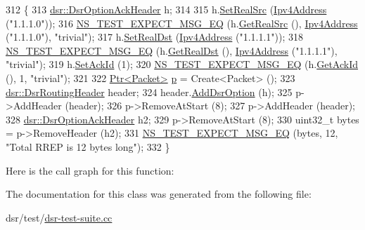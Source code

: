 \begin{DoxyCode}
312 \{
313   \hyperlink{classns3_1_1dsr_1_1DsrOptionAckHeader}{dsr::DsrOptionAckHeader} h;
314 
315   h.\hyperlink{classns3_1_1dsr_1_1DsrOptionAckHeader_a4c0aa9826576eb9ceb2ebdba5bcce673}{SetRealSrc} (\hyperlink{classns3_1_1Ipv4Address}{Ipv4Address} (\textcolor{stringliteral}{"1.1.1.0"}));
316   \hyperlink{group__testing_ga7304ba46a28d8cf08dfdfd6499cf7068}{NS\_TEST\_EXPECT\_MSG\_EQ} (h.\hyperlink{classns3_1_1dsr_1_1DsrOptionAckHeader_aea48708d400fd6c6424c5b35a170c189}{GetRealSrc} (), 
      \hyperlink{classns3_1_1Ipv4Address}{Ipv4Address} (\textcolor{stringliteral}{"1.1.1.0"}), \textcolor{stringliteral}{"trivial"});
317   h.\hyperlink{classns3_1_1dsr_1_1DsrOptionAckHeader_a539090972c2e824a62b09321589bbd3c}{SetRealDst} (\hyperlink{classns3_1_1Ipv4Address}{Ipv4Address} (\textcolor{stringliteral}{"1.1.1.1"}));
318   \hyperlink{group__testing_ga7304ba46a28d8cf08dfdfd6499cf7068}{NS\_TEST\_EXPECT\_MSG\_EQ} (h.\hyperlink{classns3_1_1dsr_1_1DsrOptionAckHeader_ac5b157fac3da1a9f86b34dd310b55ee8}{GetRealDst} (), 
      \hyperlink{classns3_1_1Ipv4Address}{Ipv4Address} (\textcolor{stringliteral}{"1.1.1.1"}), \textcolor{stringliteral}{"trivial"});
319   h.\hyperlink{classns3_1_1dsr_1_1DsrOptionAckHeader_a081c19d5e5c4d390f03205047fec0db7}{SetAckId} (1);
320   \hyperlink{group__testing_ga7304ba46a28d8cf08dfdfd6499cf7068}{NS\_TEST\_EXPECT\_MSG\_EQ} (h.\hyperlink{classns3_1_1dsr_1_1DsrOptionAckHeader_a6f675d54f56538666694a053c0b9546b}{GetAckId} (), 1, \textcolor{stringliteral}{"trivial"});
321 
322   \hyperlink{classns3_1_1Ptr}{Ptr<Packet>} \hyperlink{lte__link__budget_8m_ac9de518908a968428863f829398a4e62}{p} = Create<Packet> ();
323   \hyperlink{classns3_1_1dsr_1_1DsrRoutingHeader}{dsr::DsrRoutingHeader} header;
324   header.\hyperlink{classns3_1_1dsr_1_1DsrOptionField_acd03d07018e22f5e2b23975fae84fb3c}{AddDsrOption} (h);
325   p->AddHeader (header);
326   p->RemoveAtStart (8);
327   p->AddHeader (header);
328   \hyperlink{classns3_1_1dsr_1_1DsrOptionAckHeader}{dsr::DsrOptionAckHeader} h2;
329   p->RemoveAtStart (8);
330   uint32\_t bytes = p->RemoveHeader (h2);
331   \hyperlink{group__testing_ga7304ba46a28d8cf08dfdfd6499cf7068}{NS\_TEST\_EXPECT\_MSG\_EQ} (bytes, 12, \textcolor{stringliteral}{"Total RREP is 12 bytes long"});
332 \}
\end{DoxyCode}


Here is the call graph for this function\+:




The documentation for this class was generated from the following file\+:\begin{DoxyCompactItemize}
\item 
dsr/test/\hyperlink{dsr-test-suite_8cc}{dsr-\/test-\/suite.\+cc}\end{DoxyCompactItemize}
